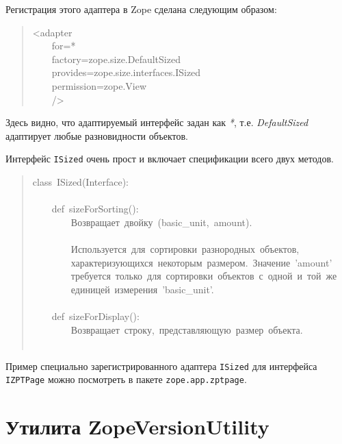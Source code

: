 \documentclass[14pt,a4paper,openany,twoside,final]{extbook}
\providecommand*{\DUroletitlereference}[1]{\textsl{#1}}
\begin{document}
Регистрация этого адаптера в Zope сделана следующим образом:

\begin{quote}{\ttfamily \raggedright \noindent
<adapter\\
~~~~for=\textquotedbl{}*\textquotedbl{}\\
~~~~factory=\textquotedbl{}zope.size.DefaultSized\textquotedbl{}\\
~~~~provides=\textquotedbl{}zope.size.interfaces.ISized\textquotedbl{}\\
~~~~permission=\textquotedbl{}zope.View\textquotedbl{}\\
~~~~/>
}
\end{quote}

Здесь видно, что адаптируемый интерфейс задан как \DUroletitlereference{*},
т.е. \DUroletitlereference{DefaultSized} адаптирует любые разновидности объектов.

Интерфейс \texttt{ISized} очень прост и включает спецификации всего двух
методов.

\begin{quote}{\ttfamily \raggedright \noindent
class~ISized(Interface):\\
~\\
~~~~def~sizeForSorting():\\
~~~~~~~~\textquotedbl{}\textquotedbl{}\textquotedbl{}Возвращает~двойку~(basic\_unit,~amount).\\
~\\
~~~~~~~~Используется~для~сортировки~разнородных~объектов,\\
~~~~~~~~характеризующихся~некоторым~размером.~Значение~'amount'\\
~~~~~~~~требуется~только~для~сортировки~объектов~с~одной~и~той~же\\
~~~~~~~~единицей~измерения~'basic\_unit'.\textquotedbl{}\textquotedbl{}\textquotedbl{}\\
~\\
~~~~def~sizeForDisplay():\\
~~~~~~~~\textquotedbl{}\textquotedbl{}\textquotedbl{}Возвращает~строку,~представляющую~размер~объекта.\\
~~~~~~~~\textquotedbl{}\textquotedbl{}\textquotedbl{}
}
\end{quote}

Пример специально зарегистрированного адаптера \texttt{ISized} для
интерфейса \texttt{IZPTPage} можно посмотреть в пакете \texttt{zope.app.zptpage}.


\section{Утилита ZopeVersionUtility%
  \label{zopeversionutility}%
}
\end{document}
